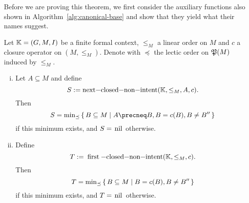 Before we are proving this theorem, we first consider the auxiliary functions also shown
in Algorithm~\ref{alg:canonical-base} and show that they yield what their names suggest.

\begin{Proposition}
  \label{prop:auxiliary-functions-canonical-base}
  Let ${\mathbb{K}} = (G, M, I)$ be a finite formal context, $\leq_M$ a linear order on $M$ and
  $c$ a closure operator on $(M, \leq_M)$.  Denote with $\preceq$ the lectic order on
  ${\mathfrak{P}(M)}$ induced by $\leq_M$.
  \begin{enumerate}[i. ]
  \item Let $A \subseteq M$ and define
    \begin{equation*}
      S := \text{\lstinline{next-closed-non-intent}}(\con K, \leq_M, A, c).
    \end{equation*}
    Then
    \begin{equation*}
      S = \min\nolimits_{\preceq} \set{ B \subseteq M \mid A \precneq B, B = c(B), B \neq
        B''}
    \end{equation*}
    if this minimum exists, and $S = \text{\lstinline{nil}}$ otherwise.
  \item Define
    \begin{equation*}
      T := \text{\lstinline{first-closed-non-intent}}(\con K, \leq_M, c).
    \end{equation*}
    Then
    \begin{equation*}
      T = \min\nolimits_{\preceq}{\{\, B \subseteq M \mid B = c(B), B \neq B'' \,\}}
    \end{equation*}
    if this minimum exists, and $T = \text{\lstinline{nil}}$ otherwise.
  \end{enumerate}
\end{Proposition}
